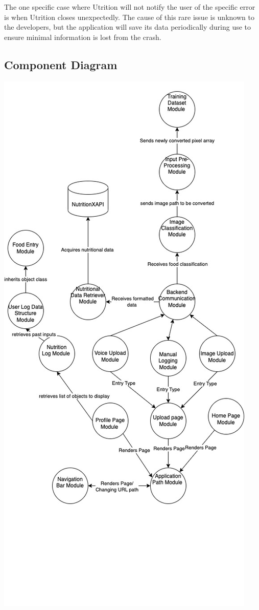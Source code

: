 \documentclass[12pt, titlepage]{article}
\begin{document}
The one specific case where Utrition will not notify the user of the specific error is when Utrition closes unexpectedly. The cause of this rare issue is unknown to the developers, but the application will save its data periodically during use to ensure minimal information is lost from the crash.

\subsection{Component Diagram}
\newpage
\includegraphics[scale=0.63]{componentdiagram.jpg}
\end{document}
